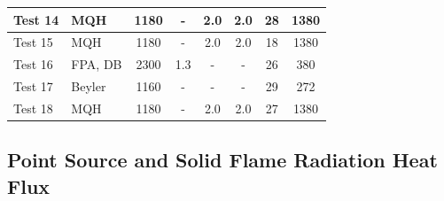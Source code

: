 \begin{table}[!ht]
\begin{center}
\begin{tabular}{|l|l|c|c|c|c|c|c|}
Test 14    &  MQH               &  1180           &  -              &  2.0             &  2.0             &  28                    &  1380              \\ \hline
Test 15    &  MQH               &  1180           &  -              &  2.0             &  2.0             &  18                    &  1380              \\ \hline
Test 16    &  FPA, DB           &  2300           &  1.3            &  -               &  -               &  26                    &  380               \\ \hline
Test 17    &  Beyler            &  1160           &  -              &  -               &  -               &  29                    &  272               \\ \hline
Test 18    &  MQH               &  1180           &  -              &  2.0             &  2.0             &  27                    &  1380              \\ \hline
\end{tabular}
\end{center}
\end{table}


\clearpage


\subsection*{Point Source and Solid Flame Radiation Heat Flux~\cite{Beyler2:SFPE}}

